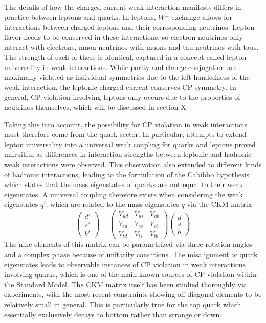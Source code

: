 The details of how the charged-current weak interaction manifests differs in practice between leptons and quarks. In 
leptons, $W^{\pm}$ exchange allows for interactions between charged leptons and their corresponding neutrinos. Lepton 
flavor needs to be conserved in these interactions, so electron neutrinos only interact with electrons, muon neutrinos with 
muons and tau neutrinos with taus. The strength of each of these is identical, captured in a concept called lepton universality in weak interactions. While parity and charge conjugation are maximally violated as individual symmetries 
due to the left-handedness of the weak interaction, the leptonic charged-current conserves CP symmetry. In general, CP 
violation involving leptons only occurs due to the properties of neutrinos themselves, which will be discussed in section 
X. \par

Taking this into account, the possibility for CP violation in weak interactions must therefore come from the quark sector. 
In particular, attempts to extend lepton universality into a universal weak coupling for quarks and leptons proved 
unfruitful as differences in interaction strengths between leptonic and hadronic weak interactions were observed. 
This observation also extended to different kinds of hadronic interactions, leading to the formulation of the Cabibbo 
hypothesis which states that the mass eigenstates of quarks are not equal to their weak eigenstates. A universal 
coupling therefore exists when considering the weak eigenstates $q'$, which are related to the mass eigenstates $q$ 
via the CKM matrix
\begin{equation}
\begin{pmatrix} d'  \\ s' \\ b' \end{pmatrix} =
\begin{pmatrix} V_{ud} & V_{us} & V_{ub} \\ V_{cd} & V_{cs} & V_{cb} \\ V_{td} & V_{ts} & V_{tb} \end{pmatrix}
\begin{pmatrix} d \\ s \\ b \end{pmatrix}
\end{equation}
The nine elements of this matrix can be parametrized via three rotation angles and a complex phase because of 
unitarity conditions. The misalignment of quark eigenstates leads to observable instances of CP violation in weak 
interactions involving quarks, which is one of the main known sources of CP violation within the Standard Model. The 
CKM matrix itself has been studied thoroughly via experiments, with the most recent constraints showing off diagonal 
elements to be relatively small in general. This is particularly true for the top quark which essentially exclusively decays 
to bottom rather than strange or down.

